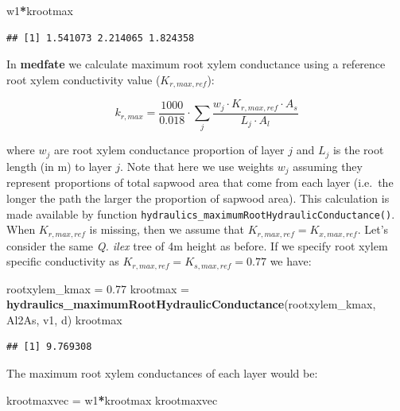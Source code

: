 \documentclass[]{book}
\newenvironment{Shaded}{\begin{snugshade}}{\end{snugshade}}
\newcommand{\KeywordTok}[1]{\textcolor[rgb]{0.13,0.29,0.53}{\textbf{#1}}}
\newcommand{\FloatTok}[1]{\textcolor[rgb]{0.00,0.00,0.81}{#1}}
\newcommand{\StringTok}[1]{\textcolor[rgb]{0.31,0.60,0.02}{#1}}
\newcommand{\OperatorTok}[1]{\textcolor[rgb]{0.81,0.36,0.00}{\textbf{#1}}}
\newcommand{\NormalTok}[1]{#1}
\begin{document}
\begin{Shaded}
\begin{Highlighting}[]
\NormalTok{w1}\OperatorTok{*}\NormalTok{krootmax}
\end{Highlighting}
\end{Shaded}

\begin{verbatim}
## [1] 1.541073 2.214065 1.824358
\end{verbatim}

In \textbf{medfate} we calculate maximum root xylem conductance using a
reference root xylem conductivity value (\(K_{r,max,ref}\)):

\begin{equation}
k_{r,max}=\frac{1000}{0.018} \cdot \sum_{j}{\frac{w_j \cdot K_{r,max,ref}\cdot A_{s}}{L_j\cdot A_{l}}}
\end{equation}

where \(w_j\) are root xylem conductance proportion of layer \(j\) and
\(L_j\) is the root length (in m) to layer \(j\). Note that here we use
weights \(w_j\) assuming they represent proportions of total sapwood
area that come from each layer (i.e.~the longer the path the larger the
proportion of sapwood area). This calculation is made available by
function \texttt{hydraulics\_maximumRootHydraulicConductance()}. When
\(K_{r,max,ref}\) is missing, then we assume that
\(K_{r,max,ref} = K_{x,max,ref}\). Let's consider the same \emph{Q.
ilex} tree of 4m height as before. If we specify root xylem specific
conductivity as \(K_{r,max,ref} = K_{s,max,ref} =0.77\) we have:

\begin{Shaded}
\begin{Highlighting}[]
\NormalTok{rootxylem_kmax =}\StringTok{ }\FloatTok{0.77}
\NormalTok{krootmax =}\StringTok{ }\KeywordTok{hydraulics_maximumRootHydraulicConductance}\NormalTok{(rootxylem_kmax, Al2As, }
\NormalTok{                                                      v1, d)}
\NormalTok{krootmax}
\end{Highlighting}
\end{Shaded}

\begin{verbatim}
## [1] 9.769308
\end{verbatim}

The maximum root xylem conductances of each layer would be:

\begin{Shaded}
\begin{Highlighting}[]
\NormalTok{krootmaxvec =}\StringTok{ }\NormalTok{w1}\OperatorTok{*}\NormalTok{krootmax}
\NormalTok{krootmaxvec}
\end{Highlighting}
\end{Shaded}
\end{document}
